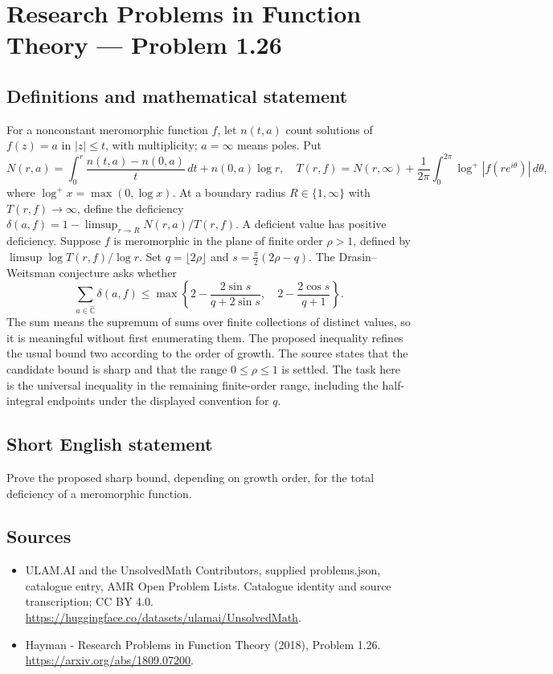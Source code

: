 \documentclass[11pt,a4paper]{article}
\begin{document}
\section*{Research Problems in Function Theory — Problem 1.26}\label{statement}

\subsection{Definitions and mathematical statement}
For a nonconstant meromorphic function $f$, let $n(t,a)$ count solutions of $f(z)=a$ in $|z|\le t$, with multiplicity; $a=\infty$ means poles. Put
\[
N(r,a)=\int_0^r\frac{n(t,a)-n(0,a)}t\,dt+n(0,a)\log r,
\quad T(r,f)=N(r,\infty)+\frac1{2\pi}\int_0^{2\pi}\log^+|f(re^{i\theta})|\,d\theta,
\]
where $\log^+x=\max(0,\log x)$. At a boundary radius $R\in\{1,\infty\}$ with $T(r,f)\to\infty$, define the deficiency
$\delta(a,f)=1-\limsup_{r\to R}N(r,a)/T(r,f)$. A deficient value has positive deficiency.
Suppose $f$ is meromorphic in the plane of finite order $\rho>1$, defined by $\limsup\log T(r,f)/\log r$. Set $q=\lfloor2\rho\rfloor$ and $s=\frac\pi2(2\rho-q)$. The Drasin--Weitsman conjecture asks whether
\[
\sum_{a\in\widehat{\mathbb C}}\delta(a,f)
\le \max\left\{2-\frac{2\sin s}{q+2\sin s},\quad
2-\frac{2\cos s}{q+1}\right\}.
\]
The sum means the supremum of sums over finite collections of distinct values, so it is meaningful without first enumerating them. The proposed inequality refines the usual bound two according to the order of growth. The source states that the candidate bound is sharp and that the range $0\le\rho\le1$ is settled. The task here is the universal inequality in the remaining finite-order range, including the half-integral endpoints under the displayed convention for $q$.
\subsection{Short English statement}
Prove the proposed sharp bound, depending on growth order, for the total deficiency of a meromorphic function.
\subsection{Sources}
\begin{itemize}
\item[S1] ULAM.AI and the UnsolvedMath Contributors, supplied problems.json, catalogue entry, AMR Open Problem Lists. Catalogue identity and source transcription; CC BY 4.0.
\url{https://huggingface.co/datasets/ulamai/UnsolvedMath}.
\item[S2] Hayman - Research Problems in Function Theory (2018), Problem 1.26. 
\url{https://arxiv.org/abs/1809.07200}.
\end{itemize}
\end{document}

